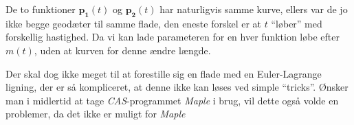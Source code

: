 De to funktioner \(\pmb{p_1}(t)\) og \(\pmb{p_2}(t)\) har naturligvis samme kurve,
ellers var de jo ikke begge geodæter til samme flade, den eneste forskel er at \(t\) ``løber'' med forskellig hastighed.
Da vi kan lade parameteren for en hver funktion løbe efter \(m(t)\), uden at kurven for denne ændre længde.

Der skal dog ikke meget til at forestille sig en flade med en Euler-Lagrange ligning, der er så kompliceret,
at denne ikke kan løses ved simple ``tricks''. Ønsker man i midlertid at tage \emph{CAS}-programmet \emph{Maple}
i brug, vil dette også volde en problemer, da det ikke er muligt for \emph{Maple} 
